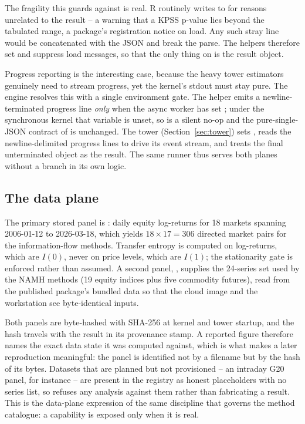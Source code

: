 The fragility this guards against is real. R routinely writes to  for
reasons unrelated to the result -- a warning that a KPSS p-value lies beyond the
tabulated range, a package's registration notice on load. Any such stray line would
be concatenated with the JSON and break the parse. The helpers therefore set
 and suppress load messages, so that the only thing on
 is the result object.

Progress reporting is the interesting case, because the heavy tower estimators
genuinely need to stream progress, yet the kernel's stdout must stay pure. The
engine resolves this with a single environment gate. The helper 
emits a newline-terminated progress line \emph{only} when the async worker has set
; under the synchronous kernel that variable is unset, so
 is a silent no-op and the pure-single-JSON contract of
 is unchanged. The tower (Section~\ref{sec:tower}) sets
, reads the newline-delimited progress lines to drive its
event stream, and treats the final unterminated object as the result. The same
runner thus serves both planes without a branch in its own logic.

\subsection{The data plane}
\label{sec:data-plane}

The primary stored panel is : daily
equity log-returns for 18 markets spanning 2006-01-12 to 2026-03-18, which yields
$18 \times 17 = 306$ directed market pairs for the information-flow methods. Transfer
entropy is computed on log-returns, which are $I(0)$, never on price levels, which
are $I(1)$; the stationarity gate is enforced rather than assumed. A second panel,
, supplies the 24-series set used by the NAMH methods (19 equity
indices plus five commodity futures), read from the published  package's
bundled data so that the cloud image and the workstation see byte-identical inputs.

Both panels are byte-hashed with SHA-256 at kernel and tower startup, and the hash
travels with the result in its provenance stamp. A reported figure therefore names
the exact data state it was computed against, which is what makes a later
reproduction meaningful: the panel is identified not by a filename but by the hash
of its bytes. Datasets that are planned but not provisioned -- an intraday G20 panel,
for instance -- are present in the registry as honest placeholders with no series
list, so  refuses any analysis against them rather than fabricating a
result. This is the data-plane expression of the same discipline that governs the
method catalogue: a capability is exposed only when it is real.

